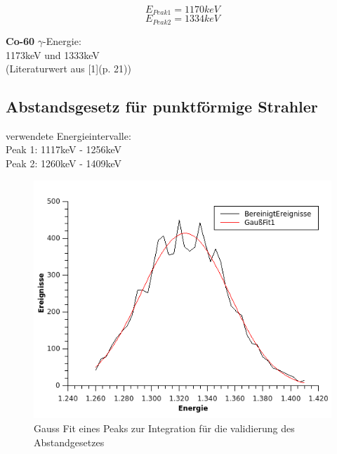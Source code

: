 \documentclass[12pt,a4paper]{article}
\begin{document}
\begin{multicols}{2}
$$E_{Peak1} = 1170keV$$
$$E_{Peak2} = 1334keV$$

\noindent
\textbf{Co-60} $\gamma$-Energie:\\
1173keV und 1333keV\\
(Literaturwert aus [1](p. 21))\\

\subsection{Abstandsgesetz für punktförmige Strahler}
verwendete Energieintervalle:\\
Peak 1: 1117keV - 1256keV\\
Peak 2: 1260keV - 1409keV\\

\begin{figure}[H]
	\centering
	\includegraphics[scale=1.2]{./figures/GammaBetaExample_Gauss.png}
	\caption{Gauss Fit eines Peaks zur Integration für die validierung des Abstandgesetzes}
	\label{fig:ausw_gammabetta_abstand}
\end{figure}


\end{multicols}
\end{document}
